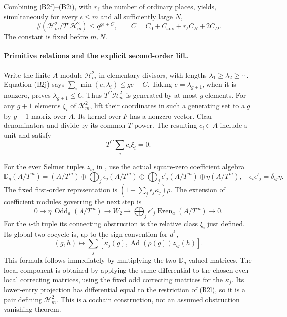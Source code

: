Combining (B2f)--(B2i), with \(r_\ell\) the number of ordinary
places, yields, simultaneously for every \(e\leq m\) and all
sufficiently large \(N\),
\[
 \#(\mathcal H^2_m/T^e\mathcal H^2_m)
           \leq q^{ge+C},\qquad
 C=C_0+C_{\mathrm{aux}}+r_\ell C_H+2C_D.
 \tag{B2j}
\]
The constant is fixed before \(m,N\).

\paragraph{Primitive relations and the explicit second-order lift.}
Write the finite \(A\)-module \(\mathcal H^2_m\) in elementary
divisors, with lengths
\(\lambda_1\geq\lambda_2\geq\cdots\).
Equation (B2j) says
\(\sum_i\min(e,\lambda_i)\leq ge+C\).
Taking \(e=\lambda_{g+1}\), when it is nonzero, proves
\(\lambda_{g+1}\leq C\).
Thus \(T^C\mathcal H^2_m\) is generated by at most \(g\) elements.
For any \(g+1\) elements \(\xi_i\) of \(\mathcal H^2_m\), lift
their coordinates in such a generating set to a \(g\) by \(g+1\)
matrix over \(A\).  Its kernel over \(F\) has a nonzero vector.
Clear denominators and divide by its common \(T\)-power.
The resulting \(c_i\in A\) include a unit and satisfy
\[
                         T^C\sum_i c_i\xi_i=0 .
 \tag{B2k}
\]

For the even Selmer tuples \(z_{ij}\) in , use the
actual square-zero coefficient algebra
\[
 \mathbb D_g(A/T^m)
  =(A/T^m)\oplus\bigoplus_j\epsilon_j(A/T^m)
    \oplus\bigoplus_j\epsilon'_j(A/T^m)\oplus\eta(A/T^m),
 \quad\epsilon_i\epsilon'_j=\delta_{ij}\eta.
\]
The fixed first-order representation is
\((1+\sum_j\epsilon_j\kappa_j)\rho\).
The extension of coefficient modules governing the next step is
\[
 0\to\eta\,\operatorname{Odd}_a(A/T^m)
       \longrightarrow W_2
       \longrightarrow
       \bigoplus_j\epsilon'_j\operatorname{Even}_a(A/T^m)\to0.
\]
For the \(i\)-th tuple its connecting obstruction is the relative
class \(\xi_i\) just defined.
Its global two-cocycle is, up to the sign convention for \(d^1\),
\[
 (g,h)\longmapsto
        \sum_j[\kappa_j(g),\operatorname{Ad}(\rho(g))z_{ij}(h)].
 \tag{B2l}
\]
This formula follows immediately by multiplying the two
\(\mathbb D_g\)-valued matrices.
The local component is obtained by applying the same differential
to the chosen even local correcting matrices, using the fixed
odd correcting matrices for the \(\kappa_j\).
Its lower-entry projection has differential equal to the
restriction of (B2l), so it is a pair defining \(\mathcal H^2_m\).
This is a cochain construction, not an assumed obstruction
vanishing theorem.


